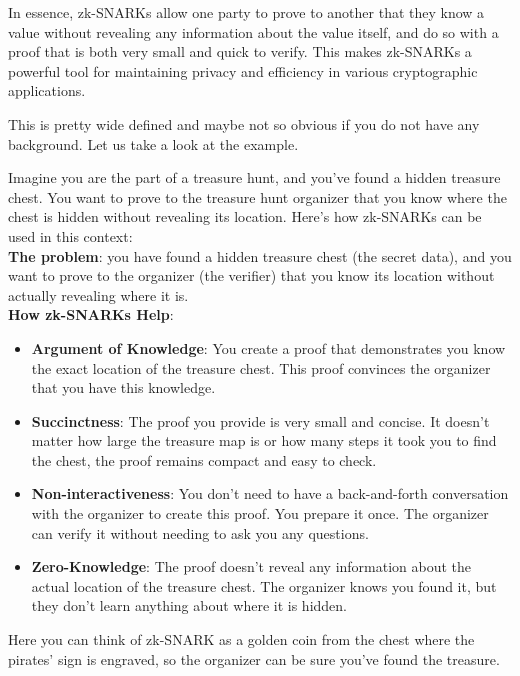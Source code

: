 \documentclass[../lecture-notes.tex]{subfiles}
\begin{document}
In essence, zk-SNARKs allow one party to prove to another that they know a value without revealing 
any information about the value itself, and do so with a proof that is both very small and quick to 
verify. This makes zk-SNARKs a powerful tool for maintaining privacy and efficiency in various 
cryptographic applications.

This is pretty wide defined and maybe not so obvious if you do not have any background. Let us take a
look at the example.

\begin{example}
    Imagine you are the part of a treasure hunt, and you've found a hidden treasure chest. You want to 
    prove to the treasure hunt organizer that you know where the chest is hidden without revealing
    its location. Here's how zk-SNARKs can be used in this context: \\

    \textbf{The problem}: you have found a hidden treasure chest (the secret data), and you want to
    prove to the organizer (the verifier) that you know its location without actually revealing 
    where it is. \\

    \textbf{How zk-SNARKs Help}:

    \begin{itemize}
        \item \textbf{Argument of Knowledge}: You create a proof that demonstrates you know the exact
        location of the treasure chest. This proof convinces the organizer that you have this 
        knowledge.
        \item \textbf{Succinctness}: The proof you provide is very small and concise. It doesn't matter how
        large the treasure map is or how many steps it took you to find the chest, the proof remains
        compact and easy to check.
        \item \textbf{Non-interactiveness}: You don't need to have a back-and-forth conversation with the 
        organizer to create this proof. You prepare it once. The organizer can verify it without 
        needing to ask you any questions.
        \item \textbf{Zero-Knowledge}: The proof doesn't reveal any information about the actual location of
        the treasure chest. The organizer knows you found it, but they don't learn anything about 
        where it is hidden. \\
    \end{itemize}

    Here you can think of zk-SNARK as a golden coin from the chest where the pirates' sign is 
    engraved, so the organizer can be sure you've found the treasure.
\end{example}
\end{document}

